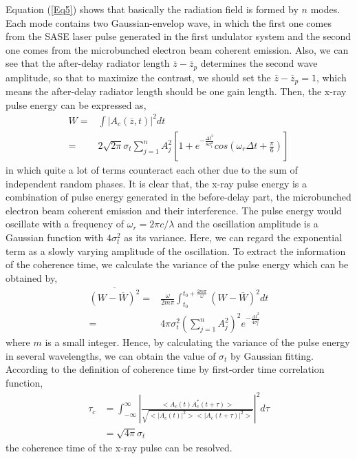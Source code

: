 \documentclass[%
 preprint,
 amsmath,amssymb,
 aps,
 prl,
 superscriptaddress,
 floatfix,
 letter,
]{revtex4-1}
\begin{document}
Equation (\ref{Eq5}) shows that basically the radiation field is formed by $n$ modes. Each mode contains two Gaussian-envelop wave, in which the first one comes from the SASE laser pulse generated in the first undulator system and the second one comes from the microbunched electron beam coherent emission. Also, we can see that the after-delay radiator length $\overline{z}-\overline{z}_{p}$ determines the second wave amplitude, so that to maximize the contrast, we should set the $\overline{z}-\overline{z}_{p} = 1$, which means the after-delay radiator length should be one gain length. Then, the x-ray pulse energy can be expressed as,
\begin{equation}\label{PulseEnergy}
\begin{split}
W=&\int |A_{c}(\overline{z},t)|^2dt \\ =&2\sqrt{2\pi}\sigma_{t}\sum_{j=1}^{n} A_{j}^2[1+e^{-\frac{\Delta t^2}{8\sigma_{t}^2}}cos(\omega_{r} \Delta t + \frac{\pi}{6})]
\end{split}
\end{equation}
in which quite a lot of terms counteract each other due to the sum of independent random phases. It is clear that, the x-ray pulse energy is a combination of pulse energy generated in the before-delay part, the microbunched electron beam coherent emission and their interference. The pulse energy would oscillate with a frequency of $\omega_{r}
=2\pi c/\lambda$ and the oscillation amplitude is a Gaussian function with $4\sigma_{t}^2$ as its variance. Here, we can regard the exponential term as a slowly varying amplitude of the oscillation. To extract the information of the coherence time, we calculate the variance of the pulse energy which can be obtained by,
\begin{equation}\label{dataana}
\begin{split}
\overline{(W-\overline{W})^2}=&\frac{\omega}{2m\pi}\int_{t_0}^{t_{0}+\frac{2m\pi}{\omega}}(W-\overline{W})^2dt \\ =& 4\pi\sigma_{t}^2 (\sum_{j=1}^{n} A_{j}^2)^2e^{-\frac{\Delta t^2}{4\sigma_{t}^2}}
\end{split}
\end{equation}
where $m$ is a small integer. Hence, by calculating the variance of the pulse energy in several wavelengths, we can obtain the value of $\sigma_{t}$ by Gaussian fitting. According to the definition of coherence time by first-order time correlation function,
\begin{equation}\label{tau}
\begin{split}
\tau_{c}&=\int_{-\infty}^{\infty} |\frac{<A_{c}(t)A_{c}^{*}(t+\tau)>}{\sqrt{<|A_{
c}(t)|^2><|A_{c}(t+\tau)|^2>}}|^2d\tau \\
&=\sqrt{4\pi}\sigma_{t}
\end{split}
\end{equation}
the coherence time of the x-ray pulse can be resolved.
\end{document}
